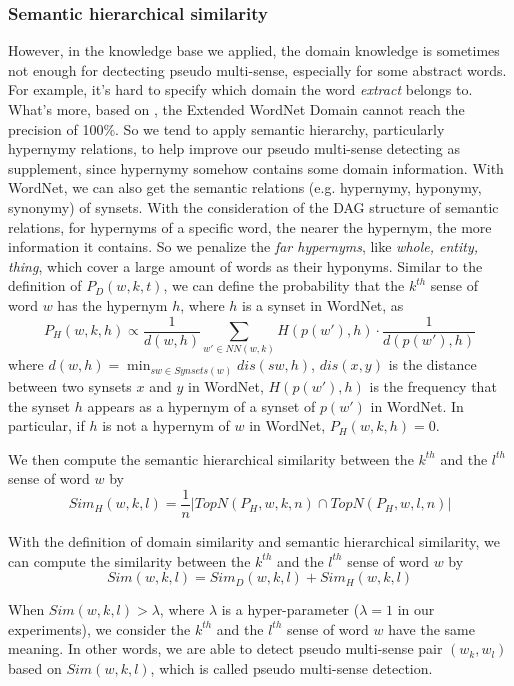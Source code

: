 \documentclass[11pt]{article}
\begin{document}
\subsubsection{Semantic hierarchical similarity}
\par
However, in the knowledge base we applied, the domain knowledge is sometimes not enough for dectecting pseudo multi-sense, especially for some abstract words. For example, it's hard to specify which domain the word {\sl extract} belongs to. What's more, based on , the Extended WordNet Domain cannot reach the precision of 100\%. So we tend to apply semantic hierarchy, particularly hypernymy relations, to help improve our pseudo multi-sense detecting as supplement, since hypernymy somehow contains some domain information. With WordNet, we can also get the semantic relations (e.g. hypernymy, hyponymy, synonymy) of synsets. With the consideration of the DAG structure of semantic relations, for hypernyms of a specific word, the nearer the hypernym, the more information it contains. So we penalize the {\sl far hypernyms}, like {\sl whole, entity, thing}, which cover a large amount of words as their hyponyms. Similar to the definition of $P_D(w,k,t)$, we can define the probability that the $k^{th}$ sense of word $w$ has the hypernym $h$, where $h$ is a synset in WordNet, as
\begin{equation} \label{phyper}
P_H(w, k, h) \propto \frac{1}{d(w,h)} {\sum_{w' \in NN(w, k)} H(p(w'), h)} \cdot \frac{1}{d(p(w'),h)}
\end{equation}
where $d(w,h) = \min_{sw \in Synsets(w)} dis(sw, h)$, $dis(x, y)$ is the distance between two synsets $x$ and $y$ in WordNet, $H(p(w'), h)$ is the frequency that the synset $h$ appears as a hypernym of a synset of $p(w')$ in WordNet. In particular, if $h$ is not a hypernym of $w$ in WordNet, $P_H(w, k, h) = 0$.
\par
We then compute the semantic hierarchical similarity between the $k^{th}$ and the $l^{th}$ sense of word $w$ by
\begin{equation} \label{simh}
Sim_H(w,k,l) = \frac 1n|TopN(P_H,w,k,n) \cap TopN(P_H,w,l,n)| 
\end{equation}
\par
With the definition of domain similarity and semantic hierarchical similarity, we can compute the similarity between the $k^{th}$ and the $l^{th}$ sense of word $w$ by
\begin{equation} \label{simall}
Sim(w,k,l) = Sim_D(w,k,l) + Sim_H(w,k,l)
\end{equation}
\par
When $Sim(w,k,l) > \lambda$, where $\lambda$ is a hyper-parameter ($\lambda = 1$ in our experiments), we consider the $k^{th}$ and the $l^{th}$ sense of word $w$ have the same meaning. In other words, we are able to detect pseudo multi-sense pair $(w_k, w_l)$ based on $Sim(w, k, l)$, which is called pseudo multi-sense detection.
\end{document}
